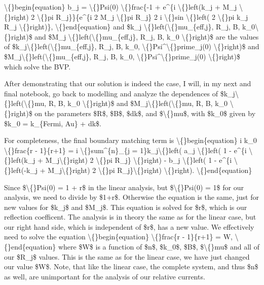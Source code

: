 \documentclass{article}
\begin{document}
\textbackslash\{\}begin\{equation\}
b\_j = \textbackslash\{\}Psi(0) \textbackslash\{\}frac\{-1 + e\textasciicircum{}\{i \textbackslash\{\}left(k\_j + M\_j \textbackslash\{\}right) 2 \textbackslash\{\}pi R\_j\}\}\{e\textasciicircum{}\{i 2 M\_j \textbackslash\{\}pi R\_j\} 2 i \textbackslash\{\}sin \textbackslash\{\}left( 2 \textbackslash\{\}pi k\_j R\_j \textbackslash\{\}right)\},
\textbackslash\{\}end\{equation\}
and \$k\_j \textbackslash\{\}left(\textbackslash\{\}mu\_\{eff,j\}, R\_j, B, k\_0\textbackslash\{\}right)\$ and \$M\_j \textbackslash\{\}left(\textbackslash\{\}mu\_\{eff,j\}, R\_j, B, k\_0 \textbackslash\{\}right)\$ are the values of \$k\_j\textbackslash\{\}left(\textbackslash\{\}mu\_\{eff,j\}, R\_j, B, k\_0, \textbackslash\{\}Psi\textasciicircum{}\textbackslash\{\}prime\_j(0) \textbackslash\{\}right)\$ and \$M\_j\textbackslash\{\}left(\textbackslash\{\}mu\_\{eff,j\}, R\_j, B, k\_0, \textbackslash\{\}Psi\textasciicircum{}\textbackslash\{\}prime\_j(0) \textbackslash\{\}right)\$ which solve the BVP.




After demonstrating that our solution is indeed the case, I will, in my next and final notebook, go back to modelling and analyze the dependences of \$k\_j\textbackslash\{\}left(\textbackslash\{\}mu, R, B, k\_0 \textbackslash\{\}right)\$ and \$M\_j\textbackslash\{\}left(\textbackslash\{\}mu, R, B, k\_0 \textbackslash\{\}right)\$ on the parameters \$R\$, \$B\$, \$dk\$, and \$\textbackslash\{\}mu\$, with \$k\_0\$ given by \$k\_0 = k\_\{Fermi, Au\} + dk\$.

For completeness, the final boundary matching term is
\textbackslash\{\}begin\{equation\}
i k\_0 \textbackslash\{\}frac\{r - 1\}\{r+1\} = i \textbackslash\{\}sum\textasciicircum{}\{n\}\_\{j = 1\}k\_j\textbackslash\{\}left( a\_j \textbackslash\{\}left( 1 - e\textasciicircum{}\{i \textbackslash\{\}left(k\_j + M\_j\textbackslash\{\}right) 2 \textbackslash\{\}pi R\_j\} \textbackslash\{\}right) - b\_j \textbackslash\{\}left( 1 - e\textasciicircum{}\{i \textbackslash\{\}left(-k\_j + M\_j\textbackslash\{\}right) 2 \textbackslash\{\}pi R\_j\}\textbackslash\{\}right) \textbackslash\{\}right).
\textbackslash\{\}end\{equation\}

Since \$\textbackslash\{\}Psi(0) = 1 + r\$ in the linear analysis, but \$\textbackslash\{\}Psi(0) = 1\$ for our analysis, we need to divide by \$1+r\$. Otherwise the equation is the same, just for new values for \$k\_j\$ and \$M\_j\$. This equation is solved for \$r\$, which is our reflection coefficent. The analysis is in theory the same as for the linear case, but our right hand side, which is independent of \$r\$, has a new value. We effectively need to solve the equation
\textbackslash\{\}begin\{equation\}
\textbackslash\{\}frac\{r - 1\}\{r+1\} = W,
\textbackslash\{\}end\{equation\}
where \$W\$ is a function of \$n\$, \$k\_0\$, \$B\$, \$\textbackslash\{\}mu\$ and all of our \$R\_j\$ values. This is the same as for the linear case, we have just changed our value \$W\$. Note, that like the linear case, the complete system, and thus \$n\$ as well, are unimportant for the analysis of our relative currents.
\end{document}
